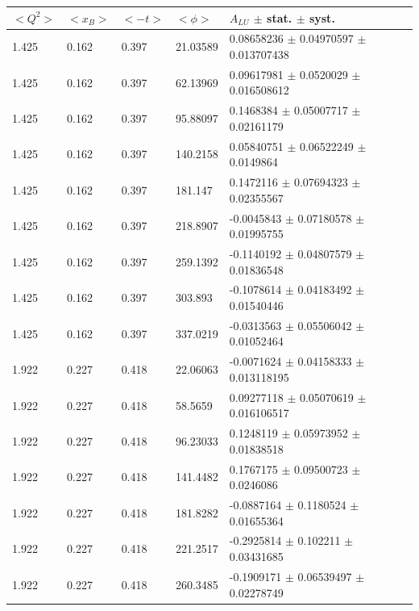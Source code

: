 \begin{table}[!h]
   \begin{center}
      \begin{tabular}{||l|l|l|l|l||}
         \hline
 $<Q^{2}>$ & $<x_{B}>$ & $<-t>$ & $<\phi>$ & $A_{LU}$ $\pm$ stat. $\pm$ syst.\\
         \hline 
  1.425 & 0.162 & 0.397 &   21.03589  &  0.08658236   $\pm$  0.04970597   $\pm$  0.013707438    \\
  1.425 & 0.162 & 0.397 &   62.13969  &  0.09617981   $\pm$  0.0520029    $\pm$  0.016508612    \\
  1.425 & 0.162 & 0.397 &   95.88097  &  0.1468384    $\pm$  0.05007717   $\pm$  0.02161179     \\
  1.425 & 0.162 & 0.397 &   140.2158  &  0.05840751   $\pm$  0.06522249   $\pm$  0.0149864      \\
  1.425 & 0.162 & 0.397 &   181.147   &  0.1472116    $\pm$  0.07694323   $\pm$  0.02355567     \\
  1.425 & 0.162 & 0.397 &   218.8907  &  -0.0045843   $\pm$  0.07180578   $\pm$  0.01995755     \\
  1.425 & 0.162 & 0.397 &   259.1392  &  -0.1140192   $\pm$  0.04807579   $\pm$  0.01836548     \\
  1.425 & 0.162 & 0.397 &   303.893   &  -0.1078614   $\pm$  0.04183492   $\pm$  0.01540446     \\
  1.425 & 0.162 & 0.397 &   337.0219  &  -0.0313563   $\pm$  0.05506042   $\pm$  0.01052464     \\
  \hline                                                                       
  1.922 & 0.227 & 0.418 &   22.06063  &  -0.0071624   $\pm$  0.04158333   $\pm$  0.013118195    \\
  1.922 & 0.227 & 0.418 &   58.5659   &  0.09277118   $\pm$  0.05070619   $\pm$  0.016106517    \\
  1.922 & 0.227 & 0.418 &   96.23033  &  0.1248119    $\pm$  0.05973952   $\pm$  0.01838518     \\
  1.922 & 0.227 & 0.418 &   141.4482  &  0.1767175    $\pm$  0.09500723   $\pm$  0.0246086      \\
  1.922 & 0.227 & 0.418 &   181.8282  &  -0.0887164   $\pm$  0.1180524    $\pm$  0.01655364     \\
  1.922 & 0.227 & 0.418 &   221.2517  &  -0.2925814   $\pm$  0.102211     $\pm$  0.03431685     \\
  1.922 & 0.227 & 0.418 &   260.3485  &  -0.1909171   $\pm$  0.06539497   $\pm$  0.02278749     \\

\end{tabular}
\end{center}
\end{table}
